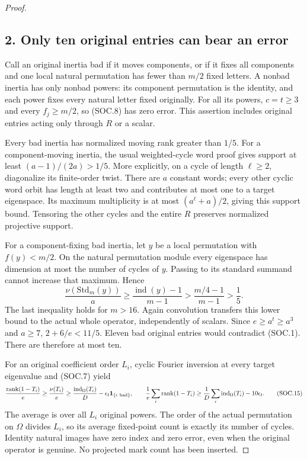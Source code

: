 \begin{proof}
\subsection*{2. Only ten original entries can bear an error}

Call an original inertia bad if it moves components, or if it fixes
all components and one local natural permutation has fewer than
\(m/2\) fixed letters. A nonbad inertia has only nonbad powers:
its component permutation is the identity, and each power fixes
every natural letter fixed originally. For all its powers,
\(c=t\ge3\) and every \(f_j\ge m/2\), so (SOC.8) has zero error.
This assertion includes original entries acting only through \(R\)
or a scalar.

Every bad inertia has normalized moving rank greater than \(1/5\).
For a component-moving inertia, the usual weighted-cycle word proof
gives support at least \((a-1)/(2a)>1/5\). More explicitly, on a
cycle of length \(\ell\ge2\), diagonalize its finite-order twist.
There are \(a\) constant words; every other cyclic word orbit has
length at least two and contributes at most one to a target eigenspace.
Its maximum multiplicity is at most
\((a^\ell+a)/2\), giving this support bound. Tensoring the other
cycles and the entire \(R\) preserves normalized projective support.

For a component-fixing bad inertia, let \(y\) be a local permutation
with \(f(y)<m/2\). On the natural permutation module every eigenspace
has dimension at most the number of cycles of \(y\). Passing to its
standard summand cannot increase that maximum. Hence
\[
 \frac{\nu(\mathrm{Std}_m(y))}{a}
 \ge\frac{\operatorname{ind}(y)-1}{m-1}
 >\frac{m/4-1}{m-1}>\frac15.
 \tag{SOC.14}
\]
The last inequality holds for \(m>16\). Again convolution transfers
this lower bound to the actual whole operator, independently of scalars.
Since \(e\ge a^t\ge a^3\) and \(a\ge7\),
\(2+6/e<11/5\). Eleven bad original entries would contradict (SOC.1).
There are therefore at most ten.

For an original coefficient order \(L_i\), cyclic Fourier inversion
at every target eigenvalue and (SOC.7) yield
\[
 \frac{\operatorname{rank}(1-T_i)}e
 \ge\frac{\nu(T_i)}e
 \ge\frac{\operatorname{ind}_\Omega(T_i)}D
               -\epsilon_t\mathbf1_{\{i\ {\rm bad}\}},\qquad
 \frac1e\sum_i\operatorname{rank}(1-T_i)
 \ge\frac1D\sum_i\operatorname{ind}_\Omega(T_i)-10\epsilon_t.
 \tag{SOC.15}
\]
The average is over all \(L_i\) original powers. The order of the
actual permutation on \(\Omega\) divides \(L_i\), so its average
fixed-point count is exactly its number of cycles. Identity natural
images have zero index and zero error, even when the original operator
is genuine. No projected mark count has been inserted.


\end{proof}
